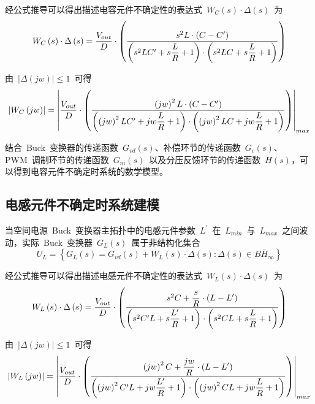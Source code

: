 经公式推导可以得出描述电容元件不确定性的表达式~$W_{C}\left(s\right)\cdot\Delta\left(s\right)$~为
\begin{equation}\label{equ:chap5:Index15}
W_{C}\left(s\right)\cdot\Delta\left(s\right)=\displaystyle\frac{V_{out}}{D}\cdot\left(\displaystyle\frac{s^2L\cdot\left(C-C^{\prime}\right)}{\left(s^2LC^{\prime}+s\displaystyle\frac{L}{R}+1\right)\cdot\left(s^2LC+s\displaystyle\frac{L}{R}+1\right)}\right)
\end{equation}

由~$\left|\Delta\left(jw\right)\right|\leqslant 1$~可得
\begin{equation}\label{equ:chap5:Index16}
\left|W_C\left(jw\right) \right|=\left|  \displaystyle\frac{V_{out}}{D}\cdot\left(\displaystyle\frac{\left(jw\right)^2L\cdot\left(C-C^{\prime}\right)}{\left(\left(jw\right)^2LC^{\prime}+jw\displaystyle\frac{L}{R}+1\right)\cdot\left(\left(jw\right)^2LC+jw\displaystyle\frac{L}{R}+1\right)}\right)
 \right|_{max}
\end{equation}

结合~Buck~变换器的传递函数~$G_{vd}\left(s\right)$、补偿环节的传递函数~$G_{c}\left(s\right)$、PWM~调制环节的传递函数~$G_{m}\left(s\right)$~以及分压反馈环节的传递函数~$H\left(s\right)$，可以得到电容元件不确定时系统的数学模型。

\subsection{电感元件不确定时系统建模}
\label{sub:chap5:C_uncertainty}

当空间电源~Buck~变换器主拓扑中的电感元件参数~$L^{\prime}$~在~$L_{min}$~与~$L_{max}$~之间波动，实际~Buck~变换器~$G_L\left(s\right)$~属于非结构化集合
\begin{equation}\label{equ:chap5:Index17}
 U_{L}=\left\{G_{L}\left(s\right)=G_{vd}\left(s\right)+W_{L}\left(s\right)\cdot \Delta\left(s\right):\Delta\left(s\right) \in  \overline{BH_{\infty}}\right\}
\end{equation}

经公式推导可以得出描述电感元件不确定性的表达式~$W_{L}\left(s\right)\cdot\Delta\left(s\right)$~为
\begin{equation}\label{equ:chap5:Index18}
W_{L}\left(s\right)\cdot\Delta\left(s\right)=\displaystyle\frac{V_{out}}{D}\cdot\left(\displaystyle\frac{s^2C+\displaystyle\frac{s}{R}\cdot\left(L-L^{\prime}\right)}{\left(s^2C^{\prime}L+s\displaystyle\frac{L^{\prime}}{R}+1\right)\cdot\left(s^2CL+s\displaystyle\frac{L}{R}+1\right)}\right)
\end{equation}

由~$\left|\Delta\left(jw\right)\right|\leqslant 1$~可得
\begin{equation}\label{equ:chap5:Index19}
\left|W_L\left(jw\right) \right|=\left|  \displaystyle\frac{V_{out}}{D}\cdot\left(\displaystyle\frac{\left(jw\right)^2C+\displaystyle\frac{jw}{R}\cdot\left(L-L^{\prime}\right)}{\left(\left(jw\right)^2C^{\prime}L+jw\displaystyle\frac{L^{\prime}}{R}+1\right)\cdot\left(\left(jw\right)^2CL+jw\displaystyle\frac{L}{R}+1\right)}\right)
 \right|_{max}
\end{equation}

